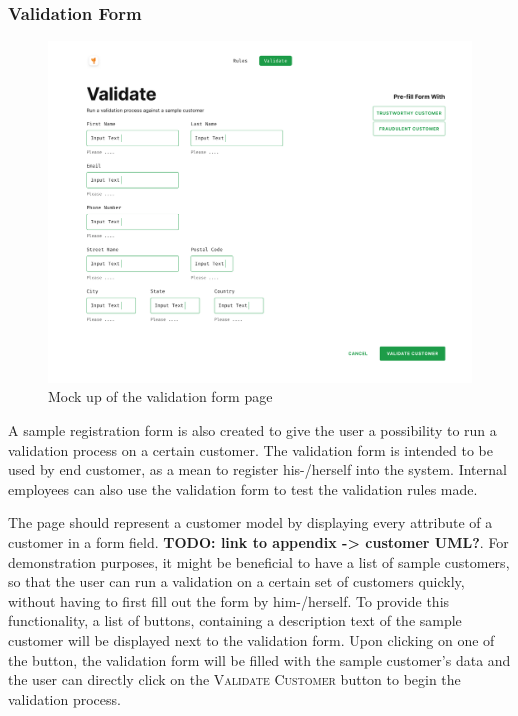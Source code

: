 \subsubsection{Validation Form}

\begin{figure}[!h]
 \includegraphics[width=\textwidth]{diagrams/mockup_validation_form.png}
 \caption{Mock up of the validation form page}
\end{figure}

A sample registration form is also created to give the user a possibility to run a validation process on a certain customer. The validation form is intended to be used by end customer, as a mean to register his-/herself into the system. Internal employees can also use the validation form to test the validation rules made.

The page should represent a customer model by displaying every attribute of a customer in a form field. \textbf{TODO: link to appendix -> customer UML?}. For demonstration purposes, it might be beneficial to have a list of sample customers, so that the user can run a validation on a certain set of customers quickly, without having to first fill out the form by him-/herself. To provide this functionality, a list of buttons, containing a description text of the sample customer will be displayed next to the validation form. Upon clicking on one of the button, the validation form will be filled with the sample customer's data and the user can directly click on the \textsc{Validate Customer} button to begin the validation process.


